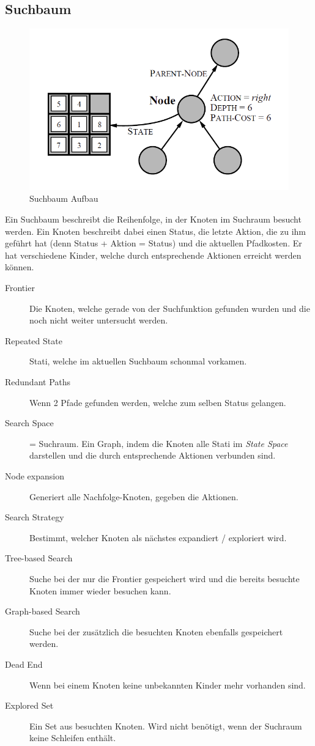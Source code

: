 \subsection{Suchbaum}
\begin{figure}[h!]
	\centering
	\includegraphics[width=0.5\linewidth]{fig/search_tree}
	\caption{Suchbaum Aufbau}
	\label{fig:search_tree}
\end{figure}
Ein Suchbaum beschreibt die Reihenfolge, in der Knoten im Suchraum besucht werden. Ein Knoten beschreibt dabei einen Status, die letzte Aktion, die zu ihm geführt hat (denn Status + Aktion = Status) und die aktuellen Pfadkosten. Er hat verschiedene Kinder, welche durch entsprechende Aktionen erreicht werden können.
\begin{description}
	\item[Frontier] Die Knoten, welche gerade von der Suchfunktion gefunden wurden und die noch nicht weiter untersucht werden.
	\item[Repeated State] Stati, welche im aktuellen Suchbaum schonmal vorkamen.
	\item[Redundant Paths] Wenn 2 Pfade gefunden werden, welche zum selben Status gelangen.
	\item[Search Space] = Suchraum. Ein Graph, indem die Knoten alle Stati im \textit{State Space} darstellen und die durch entsprechende Aktionen verbunden sind.
	\item[Node expansion] Generiert alle Nachfolge-Knoten, gegeben die Aktionen.
	\item[Search Strategy] Bestimmt, welcher Knoten als nächstes expandiert / exploriert wird.
	\item[Tree-based Search] Suche bei der nur die Frontier gespeichert wird und die bereits besuchte Knoten immer wieder besuchen kann.
	\item[Graph-based Search] Suche bei der zusätzlich die besuchten Knoten ebenfalls gespeichert werden.
	\item[Dead End] Wenn bei einem Knoten keine unbekannten Kinder mehr vorhanden sind.
	\item[Explored Set] Ein Set aus besuchten Knoten. Wird nicht benötigt, wenn der Suchraum keine Schleifen enthält.
\end{description}

